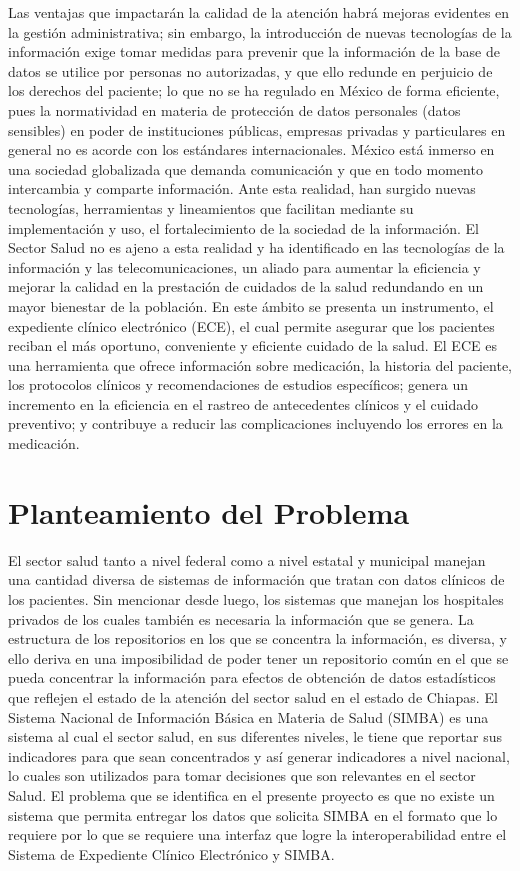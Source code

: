 Las ventajas que impactarán la calidad de la atención habrá mejoras evidentes en la gestión administrativa; sin embargo, la introducción de nuevas tecnologías de la información exige tomar medidas para prevenir que la información de la base de datos se utilice por personas no autorizadas, y que ello redunde en perjuicio de los derechos del paciente; lo que no se ha regulado en México de forma eficiente, pues la normatividad en materia de protección de datos personales (datos sensibles) en poder de instituciones públicas, empresas privadas y particulares en general no es acorde con los estándares internacionales. México está inmerso en una sociedad globalizada que demanda comunicación y que en todo momento intercambia y comparte información. Ante esta realidad, han surgido nuevas tecnologías, herramientas y lineamientos que facilitan mediante su implementación y uso, el fortalecimiento de la sociedad de la información. El Sector Salud no es ajeno a esta realidad y ha identificado en las tecnologías de la información y las telecomunicaciones, un aliado para aumentar la eficiencia y mejorar la calidad en la prestación de cuidados de la salud redundando en un mayor bienestar de la población. En este ámbito se presenta un instrumento, el expediente clínico electrónico (ECE), el cual permite asegurar que los pacientes reciban el más oportuno, conveniente y eficiente cuidado de la salud. El ECE es una herramienta que ofrece información sobre medicación, la historia del paciente, los protocolos clínicos y recomendaciones de estudios específicos; genera un incremento en la eficiencia en el rastreo de antecedentes clínicos y el cuidado preventivo; y contribuye a reducir las complicaciones incluyendo los errores en la medicación.


\section{Planteamiento del Problema}
El sector salud tanto a nivel federal como a nivel estatal y municipal manejan una cantidad diversa de sistemas de información que tratan con datos clínicos de los pacientes. Sin mencionar desde luego, los sistemas que manejan los hospitales privados de los cuales también es necesaria la información que se genera. La estructura de los repositorios en los que se concentra la información, es diversa, y ello deriva en una imposibilidad de poder tener un repositorio común en el que se pueda concentrar la información para efectos de obtención de datos estadísticos que reflejen el estado de la atención del sector salud en el estado de Chiapas.  El Sistema Nacional de Información Básica en Materia de Salud (SIMBA)  es una sistema al cual el sector salud, en sus diferentes niveles, le tiene que reportar sus indicadores para que sean concentrados y así generar indicadores a nivel nacional, lo cuales son utilizados para tomar decisiones que son relevantes en el sector Salud. El problema que se identifica en el presente proyecto es que no existe un sistema que permita entregar los datos que solicita SIMBA en el formato que lo requiere por lo que se requiere una interfaz que logre la interoperabilidad entre el Sistema de Expediente Clínico Electrónico y SIMBA.

